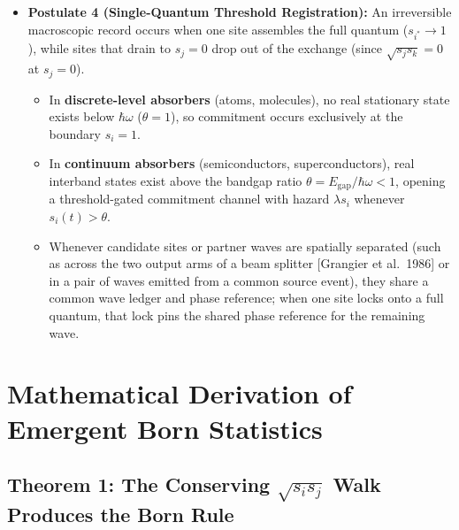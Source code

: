 \documentclass[11pt,a4paper]{article}
\begin{document}
\begin{itemize}[leftmargin=*]
    \item \textbf{Postulate 4 (Single-Quantum Threshold Registration):}
    An irreversible macroscopic record occurs when one site assembles the full quantum ($s_{i^*} \to 1$), while sites that drain to $s_j = 0$ drop out of the exchange (since $\sqrt{s_j s_k} = 0$ at $s_j = 0$).
    \begin{itemize}
        \item In \textbf{discrete-level absorbers} (atoms, molecules), no real stationary state exists below $\hbar\omega$ ($\theta = 1$), so commitment occurs exclusively at the boundary $s_i = 1$.
        \item In \textbf{continuum absorbers} (semiconductors, superconductors), real interband states exist above the bandgap ratio $\theta = E_{\mathrm{gap}}/\hbar\omega < 1$, opening a threshold-gated commitment channel with hazard $\lambda s_i$ whenever $s_i(t) > \theta$.
        \item Whenever candidate sites or partner waves are spatially separated (such as across the two output arms of a beam splitter [Grangier et al.\ 1986] or in a pair of waves emitted from a common source event), they share a common wave ledger and phase reference; when one site locks onto a full quantum, that lock pins the shared phase reference for the remaining wave.
    \end{itemize}
\end{itemize}

\section{Mathematical Derivation of Emergent Born Statistics}

\subsection{Theorem 1: The Conserving $\sqrt{s_i s_j}$ Walk Produces the Born Rule}
\end{document}
